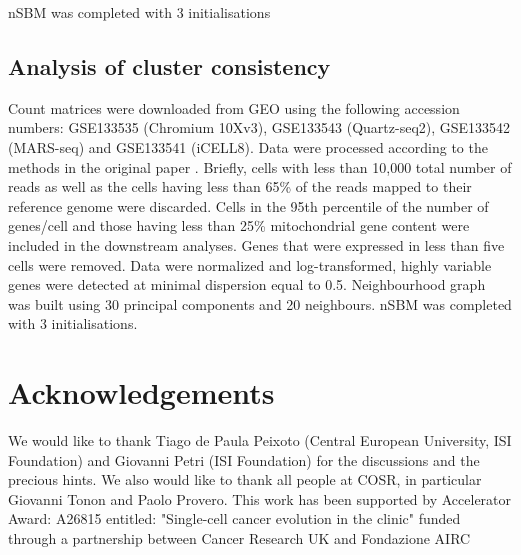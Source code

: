 \documentclass[10pt]{article}
\begin{document}
nSBM was completed with 3 initialisations

\subsection*{Analysis of cluster consistency}

Count matrices were downloaded from GEO using the following accession numbers: GSE133535 (Chromium 10Xv3), GSE133543 (Quartz-seq2), GSE133542 (MARS-seq) and GSE133541 (iCELL8). Data were processed according to the methods in the original paper \cite{mereu_2020}. Briefly, cells with less than 10,000 total number of reads as well as the cells having less than 65\% of the reads mapped to their reference genome were discarded. Cells in the 95th percentile of the number of genes/cell and those having less than 25\% mitochondrial gene content were included in the downstream analyses. Genes that were expressed in less than five cells were removed. Data were normalized and log-transformed, highly variable genes were detected at minimal dispersion equal to 0.5. Neighbourhood graph was built using 30 principal components and 20 neighbours. nSBM was completed with 3 initialisations. 


\section*{Acknowledgements}

We would like to thank Tiago de Paula Peixoto (Central European University, ISI Foundation) and Giovanni Petri (ISI Foundation) for the discussions and the precious hints. We also would like to thank all people at COSR, in particular Giovanni Tonon and Paolo Provero.
This work has been supported by Accelerator Award: A26815 entitled:  "Single-cell cancer evolution in the clinic" funded through a partnership between Cancer Research UK and Fondazione AIRC





\end{document}
